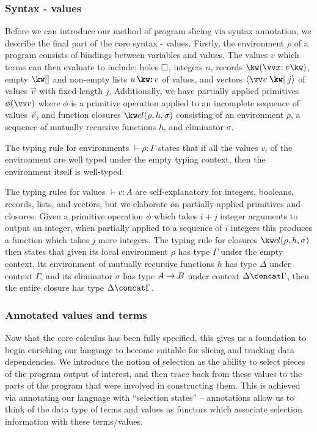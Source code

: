 \subsubsection{Syntax - values}
Before we can introduce our method of program slicing via syntax annotation, we describe the final part of the core syntax - values. Firstly, the environment $\rho$ of a program consists of bindings between variables and values. The values $v$ which terms can then evaluate to include: holes $\square$, integers $n$, records $\exRec{\vec{\bind{x}{v}}}$, empty $\exNil$ and non-empty lists $\exCons{u}{v}$ of values, and vectors $\exVecVal{\vec{v}}{j}$ of values $\vec{v}$ with fixed-length $j$. Additionally, we have partially applied primitives $\exPrimOp{\phi}{\vec{v}}$ where $\phi$ is a primitive operation applied to an incomplete sequence of values $\vec{v}$, and function closures $\exClosure{\rho}{h}{\sigma}$ consisting of an environment $\rho$, a sequence of mutually recursive functions $h$, and eliminator $\sigma$. 


\noindent
The typing rule for environments $\vdash \rho: \Gamma$ states that if all the values $v_i$ of the environment are well typed under the empty typing context, then the environment itself is well-typed. 

The typing rules for values $\vdash v: A$ are self-explanatory for integers, booleans, records, lists, and vectors, but we elaborate on partially-applied primitives and closures. Given a primitive operation $\phi$ which takes $i+j$ integer arguments to output an integer, when partially applied to a sequence of $i$ integers this produces a function which takes $j$ more integers. The typing rule for closures $\exClosure{\rho}{h}{\sigma}$ then states that given its local environment $\rho$ has type $\Gamma$ under the empty context, its environment of mutually recursive functions $h$ has type $\Delta$ under context $\Gamma$, and its eliminator $\sigma$ has type ${A}\rightarrow{B}$ under context $\Delta \concat \Gamma$, then the entire closure has type $\Delta \concat \Gamma$.



\subsubsection{Annotated values and terms}

Now that the core calculus has been fully specified, this gives us a foundation to begin enriching our language to become suitable for slicing and tracking data dependencies. We introduce the notion of selection as the ability to select pieces of the program output of interest, and then trace back from these values to the parts of the program that were involved in constructing them. This is achieved via annotating our language with ``selection states'' -- annotations allow us to think of the data type of terms and values as functors which associate selection information with these terms/values. 

